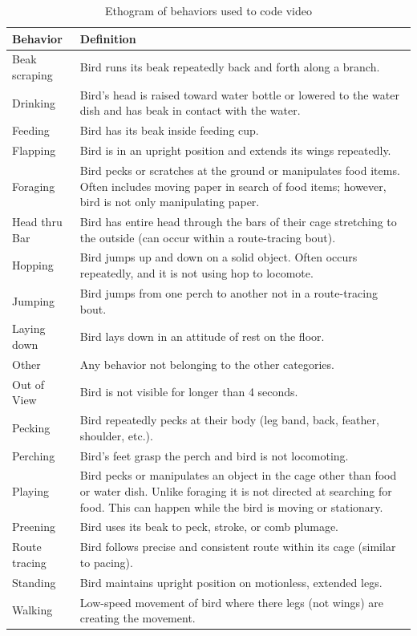 \documentclass[
  pub]{apa6}
\begin{document}
\begin{table}

\caption{\label{tab:ethogram-tbl}Ethogram of behaviors used to code video}
\centering
\fontsize{10}{12}\selectfont
\begin{tabular}[t]{>{\raggedright\arraybackslash}p{1in}>{\raggedright\arraybackslash}p{5in}}
\toprule
Behavior & Definition\\
\midrule
Beak scraping & Bird runs its beak repeatedly back and forth along a branch.\\
Drinking & Bird's head is raised toward water bottle or lowered to the water dish and has beak in contact with the water.\\
Feeding & Bird has its beak inside feeding cup.\\
Flapping & Bird is in an upright position and extends its wings repeatedly.\\
Foraging & Bird pecks or scratches at the ground or manipulates food items. Often includes moving paper in search of food items; however, bird is not only manipulating paper.\\
Head thru Bar & Bird has entire head through the bars of their cage stretching to the outside (can occur within a route-tracing bout).\\
Hopping & Bird jumps up and down on a solid object. Often occurs repeatedly, and it is not using hop to locomote.\\
Jumping & Bird jumps from one perch to another not in a route-tracing bout.\\
Laying down & Bird lays down in an attitude of rest on the floor.\\
Other & Any behavior not belonging to the other categories.\\
Out of View & Bird is not visible for longer than 4 seconds.\\
Pecking & Bird repeatedly pecks at their body (leg band, back, feather, shoulder, etc.).\\
Perching & Bird's feet grasp the perch and bird is not locomoting.\\
Playing & Bird pecks or manipulates an object in the cage other than food or water dish. Unlike foraging it is not directed at searching for food. This can happen while the bird is moving or stationary.\\
Preening & Bird uses its beak to peck, stroke, or comb plumage.\\
Route tracing & Bird follows precise and consistent route within its cage (similar to pacing).\\
Standing & Bird maintains upright position on motionless, extended legs.\\
Walking & Low-speed movement of bird where there legs (not wings) are creating the movement.\\
\bottomrule
\end{tabular}
\end{table}
\end{document}
